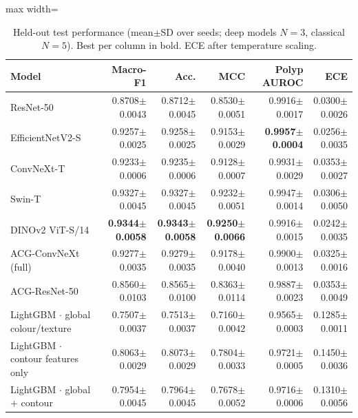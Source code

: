\begin{table}[t]
\centering
\caption{Held-out test performance (mean$\pm$SD over seeds; deep models $N{=}3$, classical $N{=}5$). Best per column in bold. ECE after temperature scaling.}
\label{tab:leaderboard}
\small
\begin{adjustbox}{max width=\linewidth}\begin{tabular}{lrrrrr}
\toprule
Model & Macro-F1 & Acc. & MCC & Polyp AUROC & ECE \\
\midrule
ResNet-50 & 0.8708{\scriptsize$\pm$0.0043} & 0.8712{\scriptsize$\pm$0.0045} & 0.8530{\scriptsize$\pm$0.0051} & 0.9916{\scriptsize$\pm$0.0017} & 0.0300{\scriptsize$\pm$0.0026} \\
EfficientNetV2-S & 0.9257{\scriptsize$\pm$0.0025} & 0.9258{\scriptsize$\pm$0.0025} & 0.9153{\scriptsize$\pm$0.0029} & \textbf{0.9957{\scriptsize$\pm$0.0004}} & 0.0256{\scriptsize$\pm$0.0035} \\
ConvNeXt-T & 0.9233{\scriptsize$\pm$0.0006} & 0.9235{\scriptsize$\pm$0.0006} & 0.9128{\scriptsize$\pm$0.0007} & 0.9931{\scriptsize$\pm$0.0029} & 0.0353{\scriptsize$\pm$0.0027} \\
Swin-T & 0.9327{\scriptsize$\pm$0.0045} & 0.9327{\scriptsize$\pm$0.0045} & 0.9232{\scriptsize$\pm$0.0051} & 0.9947{\scriptsize$\pm$0.0014} & 0.0306{\scriptsize$\pm$0.0050} \\
DINOv2 ViT-S/14 & \textbf{0.9344{\scriptsize$\pm$0.0058}} & \textbf{0.9343{\scriptsize$\pm$0.0058}} & \textbf{0.9250{\scriptsize$\pm$0.0066}} & 0.9916{\scriptsize$\pm$0.0015} & 0.0242{\scriptsize$\pm$0.0035} \\
ACG-ConvNeXt (full) & 0.9277{\scriptsize$\pm$0.0035} & 0.9279{\scriptsize$\pm$0.0035} & 0.9178{\scriptsize$\pm$0.0040} & 0.9900{\scriptsize$\pm$0.0013} & 0.0325{\scriptsize$\pm$0.0016} \\
ACG-ResNet-50 & 0.8560{\scriptsize$\pm$0.0103} & 0.8565{\scriptsize$\pm$0.0100} & 0.8363{\scriptsize$\pm$0.0114} & 0.9887{\scriptsize$\pm$0.0023} & 0.0353{\scriptsize$\pm$0.0049} \\
LightGBM $\cdot$ global colour/texture & 0.7507{\scriptsize$\pm$0.0037} & 0.7513{\scriptsize$\pm$0.0037} & 0.7160{\scriptsize$\pm$0.0042} & 0.9565{\scriptsize$\pm$0.0003} & 0.1285{\scriptsize$\pm$0.0011} \\
LightGBM $\cdot$ contour features only & 0.8063{\scriptsize$\pm$0.0029} & 0.8073{\scriptsize$\pm$0.0029} & 0.7804{\scriptsize$\pm$0.0033} & 0.9721{\scriptsize$\pm$0.0005} & 0.1450{\scriptsize$\pm$0.0036} \\
LightGBM $\cdot$ global + contour & 0.7954{\scriptsize$\pm$0.0045} & 0.7964{\scriptsize$\pm$0.0045} & 0.7678{\scriptsize$\pm$0.0052} & 0.9716{\scriptsize$\pm$0.0006} & 0.1310{\scriptsize$\pm$0.0056} \\

\end{tabular}
\end{adjustbox}
\end{table}
